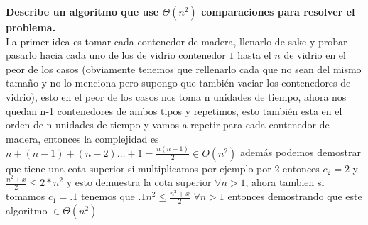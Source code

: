 \textbf{Describe un algoritmo que use $\Theta(n^2)$ comparaciones para resolver el problema.}\\

La primer idea es tomar cada contenedor de madera, llenarlo de sake y probar pasarlo hacia cada uno de los de vidrio contenedor $1$ hasta el $n$ de vidrio en el peor de los casos (obviamente tenemos que rellenarlo cada que no sean del mismo tamaño y no lo menciona pero supongo que también vaciar los contenedores de vidrio), esto en el peor de los casos nos toma n unidades de tiempo, ahora nos quedan n-1 contenedores de ambos tipos y repetimos, esto también esta en el orden de n unidades de tiempo y vamos a repetir para cada contenedor de madera, entonces la complejidad es $n+(n-1)+(n-2)\dots+1 = \frac{n(n+1)}{2} \in O(n^2)$ además podemos demostrar que tiene una cota superior si multiplicamos por ejemplo por 2 entonces $c_2=2$ y $\frac{n^2+x}{2} \leq 2*n^2$ y esto demuestra la cota superior $\forall n>1$, ahora tambien si tomamos $c_1=.1$ tenemos que $.1 n^2 \leq \frac{n^2+x}{2}$ $\forall n>1$ entonces demostrando que este algoritmo $\in \Theta(n^2)$.\\